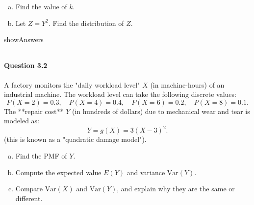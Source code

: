 \documentclass{article}
\begin{document}
\begin{enumerate}[(a)]
    \item Find the value of $k$.
    \item Let $Z=Y^2$. Find the distribution of $Z$.
\end{enumerate}
\begin{maybePrint}{showAnswers}
~\\~\\
\end{maybePrint}
%
%
{\bf Question 3.2}
~\\~\\
A factory monitors the "daily workload level" \( X \) (in machine-hours) of an industrial machine. The workload level can take the following discrete values:
\[
P(X = 2) = 0.3, \quad P(X = 4) = 0.4, \quad P(X = 6) = 0.2, \quad P(X = 8) = 0.1.
\]
The **repair cost** \( Y \) (in hundreds of dollars) due to mechanical wear and tear is modeled as:
\[
Y = g(X) = 3(X - 3)^2.
\]
(this is known as a "quadratic damage model"). 
\begin{enumerate}[(a)]
    \item Find the PMF of \( Y \).
    \item Compute the expected value \( E(Y) \) and variance \( \text{Var}(Y) \).
    \item Compare \( \text{Var}(X) \) and \( \text{Var}(Y) \), and explain why they are the same or different.
\end{enumerate}
\end{document}
